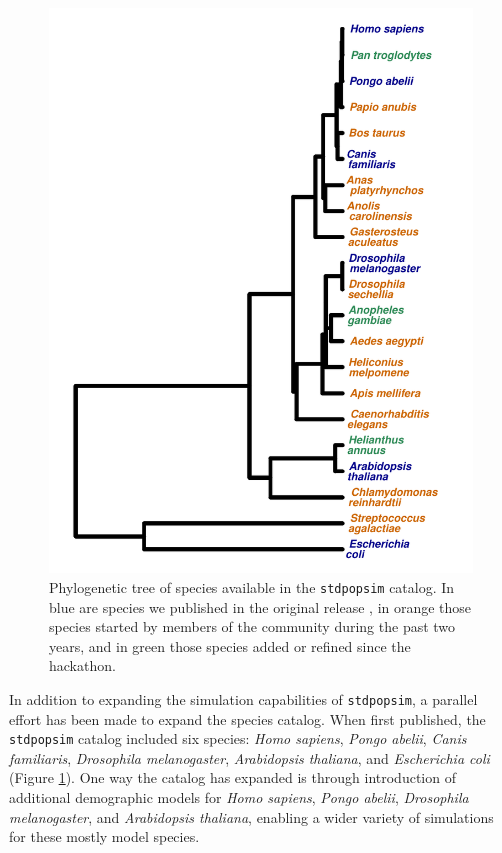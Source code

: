 \documentclass[hidelinks]{article}
\newcommand{\stdpopsim}{\texttt{stdpopsim}\xspace}
\begin{document}
\begin{figure}
    \includegraphics[width=\linewidth]{figs/species_fig}
	\caption{Phylogenetic tree of species available in the \stdpopsim catalog.
		In blue are species we published in the original release \citep{Adrion2020}, in orange those 
		species started by members of the community during the past two years, and in green those species
		added or refined since the hackathon.
	\label{fig:tree} }
\end{figure}


In addition to expanding the simulation capabilities of \stdpopsim,
a parallel effort has been made to expand the species catalog.
When first published, the \stdpopsim catalog included six species:
\emph{Homo sapiens}, \emph{Pongo abelii}, \emph{Canis familiaris}, \emph{Drosophila melanogaster},
\emph{Arabidopsis thaliana}, and \emph{Escherichia coli} (Figure \ref{fig:tree}).
One way the catalog has expanded is through introduction of additional demographic models
for \emph{Homo sapiens}, \emph{Pongo abelii}, \emph{Drosophila melanogaster},
and \emph{Arabidopsis thaliana}, enabling a wider variety of simulations for these
mostly model species.
\end{document}
